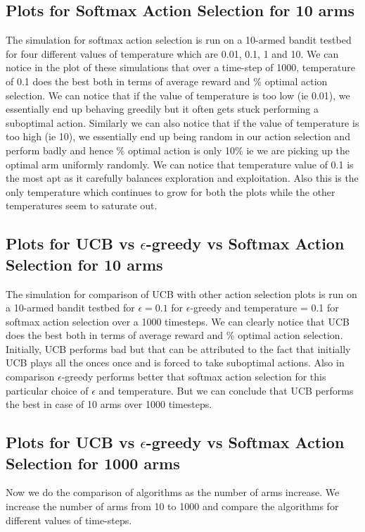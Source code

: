 \documentclass[english]{article}
\begin{document}
\subsection{Plots for Softmax Action Selection for 10 arms}
The simulation for softmax action selection is run on a 10-armed bandit testbed for four different values of temperature which are 0.01, 0.1, 1 and 10. We can notice in the plot of these simulations that over a time-step of 1000, temperature of 0.1 does the best both in terms of average reward and \% optimal action selection. We can notice that if the value of temperature is too low (ie 0.01), we essentially end up behaving greedily but it often gets stuck performing a suboptimal action. Similarly we can also notice that if the value of temperature is too high (ie 10), we essentially end up being random in our action selection and perform badly and hence \% optimal action is only 10\% ie we are picking up the optimal arm uniformly randomly. We can notice that temperature value of 0.1 is the most apt as it carefully balances exploration and exploitation. Also this is the only temperature which continues to grow for both the plots while the other temperatures seem to saturate out.

\subsection{Plots for UCB vs $\epsilon$-greedy vs Softmax Action Selection for 10 arms}
The simulation for comparison of UCB with other action selection plots is run on a 10-armed bandit testbed for $\epsilon=0.1$ for $\epsilon$-greedy and temperature = 0.1 for softmax action selection over a 1000 timesteps. We can clearly notice that UCB does the best both in terms of average reward and \% optimal action selection. Initially, UCB performs bad but that can be attributed to the fact that initially UCB plays all the onces once and is forced to take suboptimal actions. Also in comparison $\epsilon$-greedy performs better that softmax action selection for this particular choice of $\epsilon$ and temperature. But we can conclude that UCB performs the best in case of 10 arms over 1000 timesteps.

\subsection{Plots for UCB vs $\epsilon$-greedy vs Softmax Action Selection for 1000 arms}
Now we do the comparison of algorithms as the number of arms increase. We increase the number of arms from 10 to 1000 and compare the algorithms for different values of time-steps.
\end{document}
